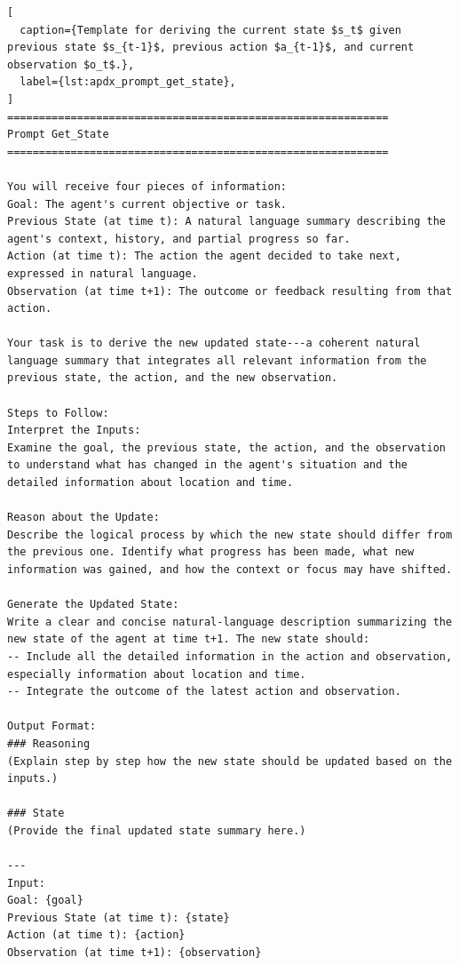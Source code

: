 \begin{lstlisting}[
  caption={Template for deriving the current state $s_t$ given previous state $s_{t-1}$, previous action $a_{t-1}$, and current observation $o_t$.},
  label={lst:apdx_prompt_get_state},
]
============================================================
Prompt Get_State
============================================================

You will receive four pieces of information:
Goal: The agent's current objective or task.
Previous State (at time t): A natural language summary describing the agent's context, history, and partial progress so far.
Action (at time t): The action the agent decided to take next, expressed in natural language.
Observation (at time t+1): The outcome or feedback resulting from that action.

Your task is to derive the new updated state---a coherent natural language summary that integrates all relevant information from the previous state, the action, and the new observation.

Steps to Follow:
Interpret the Inputs:
Examine the goal, the previous state, the action, and the observation to understand what has changed in the agent's situation and the detailed information about location and time.

Reason about the Update:
Describe the logical process by which the new state should differ from the previous one. Identify what progress has been made, what new information was gained, and how the context or focus may have shifted.

Generate the Updated State:
Write a clear and concise natural-language description summarizing the new state of the agent at time t+1. The new state should:
-- Include all the detailed information in the action and observation, especially information about location and time.
-- Integrate the outcome of the latest action and observation.

Output Format:
### Reasoning
(Explain step by step how the new state should be updated based on the inputs.)

### State
(Provide the final updated state summary here.)

---
Input:
Goal: {goal}
Previous State (at time t): {state}
Action (at time t): {action}
Observation (at time t+1): {observation}
\end{lstlisting}
